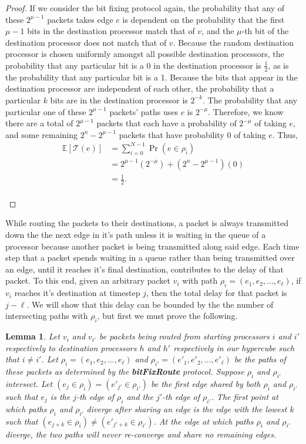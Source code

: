 \documentclass[psamsfonts, 10pt]{amsart}
\newtheorem{lem}[thm]{Lemma}
\theoremstyle{definition}
\theoremstyle{remark}
\numberwithin{equation}{section}
\newcommand{\E}{\mathbb{E}}
\newcommand{\creturn}{\mbox{}\\}
\begin{document}
\begin{proof}
If we consider the bit fixing protocol again, the probability that any of these $2^{\mu-1}$ packets takes edge $e$ is dependent on the probability that the first $\mu-1$ bits in the destination processor match that of $v$, and the $\mu$-th bit of the destination processor does not match that of $v$. Because the random destination processor is chosen uniformly amongst all possible destination processors, the probability that any particular bit is a 0 in the destination processor is $\frac{1}{2}$, as is the probability that any particular bit is a 1. Because the bits that appear in the destination processor are independent of each other, the probability that a particular $k$ bits are in the destination processor is  $2^{-k}$. The probability that any particular one of these $2^{\mu-1}$ packets' paths uses $e$ is $2^{-\mu}$. Therefore, we know there are a total of $2^{\mu-1}$ packets that each have a probability of $2^{- \mu}$ of taking $e$, and some remaining $2^n - 2^{\mu-1}$ packets that have probability 0 of taking $e$. Thus, 
\[
\begin{aligned}
 \E[\mathcal{T}(e)] &= \sum_{i = 0}^{N-1} \Pr(e \in \rho_i)\\
 &= 2^{\mu - 1}(2^{-\mu}) + (2^{n} - 2^{\mu-1})(0)\\
 &= \frac{1}{2}.
 \end{aligned}
\]
\creturn
 \end{proof}
 
While routing the packets to their destinations, a packet is always transmitted down the the next edge in it's path unless it is waiting in the queue of a processor because another packet is being transmitted along said edge. Each time step that a packet spends waiting in a queue rather than being transmitted over an edge, until it reaches it's final destination, contributes to the delay of that packet. To this end, given an arbitrary packet $v_i$ with path $\rho_i = (e_1, e_2, ..., e_{\ell})$, if $v_i$ reaches it's destination at timestep $j$, then the total delay for that packet is $j - \ell$. We will show that this delay can be bounded by the the number of intersecting paths with $\rho_i$, but first we must prove the following.

\begin{lem}
Let $v_i$ and $v_{i'}$ be packets being routed from starting processors $i$ and $i'$ respectively to destination processors $h$ and $h'$ respectively in our hypercube such that $i \neq i'$. Let $\rho_i = (e_1, e_2, ..., e_{\ell})$ and $\rho_{i'} = (e'_{1}, e'_{2}, ..., e'_{\ell})$ be the paths of these packets as determined by the {\bf bitFixRoute} protocol. Suppose $\rho_i$ and $\rho_{i'}$ intersect. Let $(e_j \in \rho_i) = (e'_{j'} \in \rho_{i'})$ be the first edge shared by both $\rho_i$ and $\rho_{i'}$ such that $e_j$ is the $j$-th edge of $\rho_i$ and the $j'$-th edge of $\rho_{i'}$. The first point at which paths $\rho_i$ and $\rho_{i'}$ diverge after sharing an edge is the edge with the lowest $k$ such that $(e_{j +k} \in \rho_i) \neq (e'_{j' +k} \in \rho_{i'})$. At the edge at which paths $\rho_i$ and $\rho_{i'}$ diverge, the two paths will never re-converge and share no remaining edges.
\end{lem}
\end{document}
